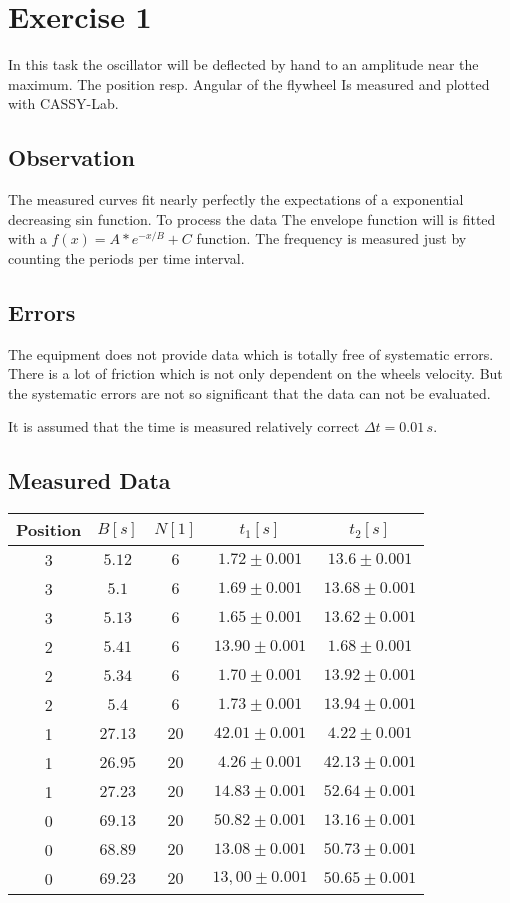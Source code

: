 \newpage
\section{Exercise 1}
In this task the oscillator will be deflected by hand to an amplitude near the maximum. The position resp. Angular of the flywheel Is measured and plotted with CASSY-Lab. 
\subsection{Observation}
The measured curves fit nearly perfectly the expectations of a exponential decreasing sin function. To process the data The envelope function will is fitted with a \(f(x)=A*e^{-x/B}+C\) function. The frequency  is measured just by counting the periods per time interval.
\subsection{Errors}
The equipment does not provide data which is totally free of systematic errors. There is a lot of friction which is not only dependent on the wheels velocity. But the systematic errors are not so significant that the data can not be evaluated.

It is assumed that the time is measured relatively correct \(\Delta t = 0.01\, s\). 
\subsection{Measured Data}
\begin{center}
\begin{tabular}{c|cccc}
Position & \(B [s]\) & \(N [1]\) & \(t_1 [s]\) & \(t_2 [s]\) \\ \hline
3 & \(5.12\) & \(6\) & \(1.72 \pm 0.001\) & \(13.6 \pm 0.001\) \\ 
3 & \(5.1\) & \(6\) & \(1.69 \pm 0.001\) & \(13.68 \pm 0.001\) \\ 
3 & \(5.13\) & \(6\) & \(1.65 \pm 0.001\) & \(13.62 \pm 0.001\) \\ 
2 & \(5.41\) & \(6\) & \(13.90 \pm 0.001\) & \(1.68 \pm 0.001\) \\ 
2 & \(5.34\) & \(6\) & \(1.70 \pm 0.001\) & \(13.92 \pm 0.001\) \\ 
2 & \(5.4\) & \(6\) & \(1.73 \pm 0.001\) & \(13.94 \pm 0.001\) \\ 
1 & \(27.13\) & \(20\) & \(42.01 \pm 0.001\) & \(4.22 \pm 0.001\) \\ 
1 & \(26.95\) & \(20\) & \(4.26 \pm 0.001\) & \(42.13 \pm 0.001\) \\ 
1 & \(27.23\) & \(20\) & \(14.83 \pm 0.001\) & \(52.64 \pm 0.001\) \\ 
0 & \(69.13\) & \(20\) & \(50.82 \pm 0.001\) & \(13.16 \pm 0.001\) \\ 
0 & \(68.89\) & \(20\) & \(13.08 \pm 0.001\) & \(50.73 \pm 0.001\) \\ 
0 & \(69.23\) & \(20\) & \(13,00 \pm 0.001\) & \(50.65 \pm 0.001\) \\ 
\end{tabular}
\end{center}
\newpage
